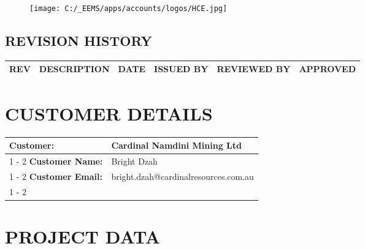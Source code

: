 \documentclass{article}%
\begin{document}
\begin{figure}[h!]%
\texttt{[image: C:/\_EEMS/apps/accounts/logos/HCE.jpg]}%
\centering%
\end{figure}

%
\newpage%
\begin{center}%
\section*{REVISION HISTORY}%
\label{sec:REVISIONHISTORY}%

%
\begin{minipage}{\textwidth}%
\centering%
\begin{tabular}{|c |c |c |c |c |c |}%
\hline%
\textbf{REV}&\textbf{DESCRIPTION}&\textbf{DATE}&\textbf{ISSUED BY}&\textbf{REVIEWED BY}&\textbf{APPROVED}\\%
\hline%
\end{tabular}%
\end{minipage}%
\end{center}%
\newpage%
\section{CUSTOMER DETAILS}%
\label{sec:CUSTOMERDETAILS}%
\begin{flushleft}%
\begin{minipage}{\textwidth}%
\centering%
\begin{tabular}{|l |l |}%
\hline%
\textbf{Customer:}&Cardinal Namdini Mining Ltd\\%
\cline{1%
-%
2}%
\textbf{Customer Name:}&Bright Dzah\\%
\cline{1%
-%
2}%
\textbf{Customer Email:}&bright.dzah@cardinalresources.com.au\\%
\cline{1%
-%
2}%
\end{tabular}%
\end{minipage}%
\end{flushleft}

%
\newpage%
\section{PROJECT DATA}%
\label{sec:PROJECTDATA}%
\end{document}
